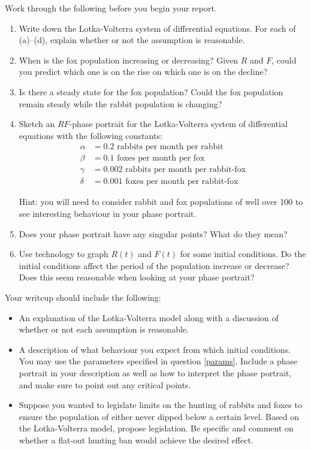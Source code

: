 	Work through the following before you begin your report.

	\begin{enumerate}[label=\emph{\arabic*.}]
		\item Write down the Lotka-Volterra system of differential equations.  For
			each of (a)--(d), explain whether or not the assumption is reasonable.
		\item When is the fox population increasing or decreasing?  Given $R$ and $F$,
			could you predict which one is on the rise on which one is on the decline?
		\item Is there a steady state for the fox population?  Could the fox population
			remain steady while the rabbit population is changing?
		\item \label{params}
			Sketch an $RF$-phase portrait for the Lotka-Volterra system of differential
			equations with the following constants:
			\begin{align*}
				\alpha &= 0.2\text{ rabbits per month per rabbit}\\
				\beta &= 0.1\text{ foxes per month per fox}\\
				\gamma &= 0.002\text{ rabbits per month per rabbit-fox}\\
				\delta &= 0.001\text{ foxes per month per rabbit-fox}
			\end{align*}

			Hint: you will need to consider rabbit and fox populations of well over
			100 to see interesting behaviour in your phase portrait.
		\item Does your phase portrait have any singular points?  What do they mean?
		\item Use technology to graph $R(t)$ and $F(t)$ for some initial conditions.  
			Do the initial conditions affect the period of the population increase
			or decrease?  Does this seem reasonable when looking at your phase portrait?
	\end{enumerate}


	Your writeup should include the following:
	\begin{itemize}
		\item An explanation of the Lotka-Volterra model along with a discussion of
			whether or not each assumption is reasonable.
		\item A description of what behaviour you expect from which initial conditions.  You may use
			the parameters specified in question \ref{params}.  Include a phase portrait in
			your description as well as how to interpret the phase portrait, and make sure to point
			out any critical points.
		\item Suppose you wanted to legislate limits on the hunting of rabbits and foxes to ensure the population of either
			never dipped below a certain level.  Based on the Lotka-Volterra model, propose
			legislation.  Be specific and comment on whether a flat-out hunting ban
			would achieve the desired effect.
	\end{itemize}



